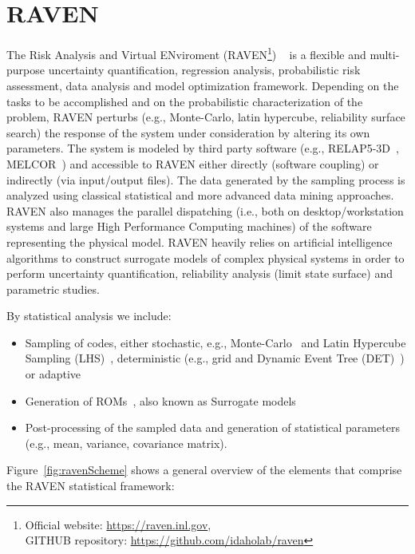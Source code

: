 \section{RAVEN}
\label{sec:raven}
 
The Risk Analysis and Virtual ENviroment 
(RAVEN\footnote{Official website: \url{https://raven.inl.gov},\\ 
GITHUB repository: \url{https://github.com/idaholab/raven}})
~\cite{RAVEN_PSAM_2014,alfonsiEsrel2014} 
is a flexible and multi-purpose uncertainty quantification, regression analysis, probabilistic
risk assessment, data analysis and model optimization framework. Depending on the tasks to be 
accomplished and on the probabilistic characterization of the problem, RAVEN perturbs 
(e.g., Monte-Carlo, latin hypercube, reliability surface search) the response of the system 
under consideration by altering its own parameters. The system is modeled by third party software 
(e.g., RELAP5-3D~\cite{relap5}, MELCOR~\cite{Melcor}) and accessible to RAVEN either directly 
(software coupling) or indirectly (via input/output files). 
The data generated by the sampling process is analyzed using 
classical statistical and more advanced data mining approaches. RAVEN also manages the parallel dispatching 
(i.e., both on desktop/workstation systems and large High Performance Computing machines) of the software 
representing the physical model. RAVEN heavily relies on artificial intelligence algorithms to construct 
surrogate models of complex physical systems in order to perform uncertainty quantification, reliability 
analysis (limit state surface) and parametric studies.

By statistical analysis we include:
\begin{itemize}
  \item Sampling of codes, either stochastic, e.g., Monte-Carlo~\cite{DynamicReliabilityMonteCarlo} 
        and Latin Hypercube Sampling (LHS)~\cite{LHShelton}, deterministic (e.g., grid and
        Dynamic Event Tree (DET)~\cite{AMENDOLAdylam,cojazziDylam}) or 
        adaptive~\cite{ANS_S_2014_raven_LS,mandelliSVMANS}
  \item Generation of ROMs~\cite{ROM_Khalik}, also known as Surrogate models
  \item Post-processing of the sampled data and generation of statistical parameters (e.g., mean, 
        variance, covariance matrix).
\end{itemize}

Figure~\ref{fig:ravenScheme} shows a general overview of the elements that comprise the RAVEN 
statistical framework:


